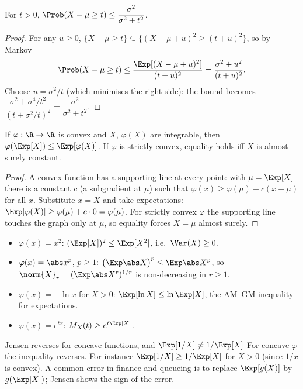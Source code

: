 \begin{theorem}\label{thm:cantelli}
For $t>0$, $\Prob(X-\mu\ge t)\le\dfrac{\sigma^2}{\sigma^2+t^2}$.
\end{theorem}
\begin{proof}
For any $u\ge0$, $\{X-\mu\ge t\}\subseteq\{(X-\mu+u)^2\ge(t+u)^2\}$, so by Markov
\[
\Prob(X-\mu\ge t)\le\frac{\Exp[(X-\mu+u)^2]}{(t+u)^2}=\frac{\sigma^2+u^2}{(t+u)^2}.
\]
Choose $u=\sigma^2/t$ (which minimises the right side): the bound becomes
$\dfrac{\sigma^2+\sigma^4/t^2}{(t+\sigma^2/t)^2}=\dfrac{\sigma^2}{\sigma^2+t^2}$.
\end{proof}

\begin{theorem}\label{thm:jensen}
If $\varphi:\R\to\R$ is convex and $X$, $\varphi(X)$ are integrable, then
$\varphi(\Exp[X])\le\Exp[\varphi(X)]$. If $\varphi$ is strictly convex, equality holds
iff $X$ is almost surely constant.
\end{theorem}
\begin{proof}
A convex function has a supporting line at every point: with $\mu=\Exp[X]$ there is
a constant $c$ (a subgradient at $\mu$) such that
$\varphi(x)\ge\varphi(\mu)+c(x-\mu)$ for all $x$. Substitute $x=X$ and take
expectations: $\Exp[\varphi(X)]\ge\varphi(\mu)+c\cdot0=\varphi(\mu)$. For strictly
convex $\varphi$ the supporting line touches the graph only at $\mu$, so equality
forces $X=\mu$ almost surely.
\end{proof}

\begin{example}
\begin{itemize}
\item $\varphi(x)=x^2$: $(\Exp[X])^2\le\Exp[X^2]$, i.e.\ $\Var(X)\ge0$.
\item $\varphi(x)=\abs x^p$, $p\ge1$: $\bigl(\Exp\abs X\bigr)^p\le\Exp\abs X^p$, so
$\norm{X}_r=(\Exp\abs X^r)^{1/r}$ is non-decreasing in $r\ge1$.
\item $\varphi(x)=-\ln x$ for $X>0$: $\Exp[\ln X]\le\ln\Exp[X]$, the AM--GM inequality
for expectations.
\item $\varphi(x)=e^{tx}$: $M_X(t)\ge e^{t\Exp[X]}$.
\end{itemize}
\end{example}

\begin{pitfall}{Jensen reverses for concave functions, and $\Exp[1/X]\ne1/\Exp[X]$}
For concave $\varphi$ the inequality reverses. For instance
$\Exp[1/X]\ge1/\Exp[X]$ for $X>0$ (since $1/x$ is convex). A common error in
finance and queueing is to replace $\Exp[g(X)]$ by $g(\Exp[X])$; Jensen shows the
sign of the error.
\end{pitfall}

